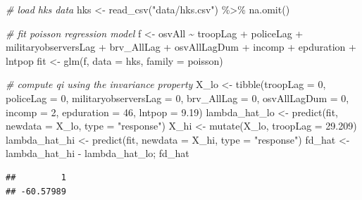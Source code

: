 \documentclass[
]{book}
\newenvironment{Shaded}{\begin{snugshade}}{\end{snugshade}}
\newcommand{\AttributeTok}[1]{\textcolor[rgb]{0.77,0.63,0.00}{#1}}
\newcommand{\CommentTok}[1]{\textcolor[rgb]{0.56,0.35,0.01}{\textit{#1}}}
\newcommand{\DecValTok}[1]{\textcolor[rgb]{0.00,0.00,0.81}{#1}}
\newcommand{\FloatTok}[1]{\textcolor[rgb]{0.00,0.00,0.81}{#1}}
\newcommand{\FunctionTok}[1]{\textcolor[rgb]{0.00,0.00,0.00}{#1}}
\newcommand{\NormalTok}[1]{#1}
\newcommand{\OtherTok}[1]{\textcolor[rgb]{0.56,0.35,0.01}{#1}}
\newcommand{\SpecialCharTok}[1]{\textcolor[rgb]{0.00,0.00,0.00}{#1}}
\newcommand{\StringTok}[1]{\textcolor[rgb]{0.31,0.60,0.02}{#1}}
\begin{document}
\begin{Shaded}
\begin{Highlighting}[]
\CommentTok{\# load hks data}
\NormalTok{hks }\OtherTok{\textless{}{-}} \FunctionTok{read\_csv}\NormalTok{(}\StringTok{"data/hks.csv"}\NormalTok{) }\SpecialCharTok{\%\textgreater{}\%}
  \FunctionTok{na.omit}\NormalTok{()}

\CommentTok{\# fit poisson regression model}
\NormalTok{f }\OtherTok{\textless{}{-}}\NormalTok{ osvAll }\SpecialCharTok{\textasciitilde{}}\NormalTok{ troopLag }\SpecialCharTok{+}\NormalTok{ policeLag }\SpecialCharTok{+}\NormalTok{ militaryobserversLag }\SpecialCharTok{+} 
\NormalTok{  brv\_AllLag }\SpecialCharTok{+}\NormalTok{ osvAllLagDum }\SpecialCharTok{+}\NormalTok{ incomp }\SpecialCharTok{+}\NormalTok{ epduration }\SpecialCharTok{+} 
\NormalTok{  lntpop}
\NormalTok{fit }\OtherTok{\textless{}{-}} \FunctionTok{glm}\NormalTok{(f, }\AttributeTok{data =}\NormalTok{ hks, }\AttributeTok{family =}\NormalTok{ poisson)}

\CommentTok{\# compute qi using the invariance property}
\NormalTok{X\_lo }\OtherTok{\textless{}{-}} \FunctionTok{tibble}\NormalTok{(}\AttributeTok{troopLag =} \DecValTok{0}\NormalTok{,}
               \AttributeTok{policeLag =} \DecValTok{0}\NormalTok{, }
               \AttributeTok{militaryobserversLag =} \DecValTok{0}\NormalTok{, }
               \AttributeTok{brv\_AllLag =} \DecValTok{0}\NormalTok{,}
               \AttributeTok{osvAllLagDum =} \DecValTok{0}\NormalTok{, }
               \AttributeTok{incomp =} \DecValTok{2}\NormalTok{,}
               \AttributeTok{epduration =} \DecValTok{46}\NormalTok{,}
               \AttributeTok{lntpop =} \FloatTok{9.19}\NormalTok{)}
\NormalTok{lambda\_hat\_lo }\OtherTok{\textless{}{-}} \FunctionTok{predict}\NormalTok{(fit, }\AttributeTok{newdata =}\NormalTok{ X\_lo, }\AttributeTok{type =} \StringTok{"response"}\NormalTok{)}
\NormalTok{X\_hi }\OtherTok{\textless{}{-}} \FunctionTok{mutate}\NormalTok{(X\_lo, }\AttributeTok{troopLag =} \FloatTok{29.209}\NormalTok{)}
\NormalTok{lambda\_hat\_hi }\OtherTok{\textless{}{-}} \FunctionTok{predict}\NormalTok{(fit, }\AttributeTok{newdata =}\NormalTok{ X\_hi, }\AttributeTok{type =} \StringTok{"response"}\NormalTok{)}
\NormalTok{fd\_hat }\OtherTok{\textless{}{-}}\NormalTok{ lambda\_hat\_hi }\SpecialCharTok{{-}}\NormalTok{ lambda\_hat\_lo; fd\_hat}
\end{Highlighting}
\end{Shaded}

\begin{verbatim}
##         1 
## -60.57989
\end{verbatim}
\end{document}

